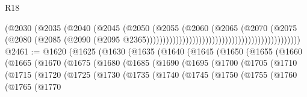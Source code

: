 \begin{lexlean}{R18}
\begin{coremodule}
                                                                      (@2030
                                                                        (@2035
                                                                          (@2040
                                                                            (@2045
                                                                              (@2050
                                                                                (@2055
                                                                                  (@2060
                                                                                    (@2065
                                                                                      (@2070
                                                                                        (@2075
                                                                                          (@2080
                                                                                            (@2085
                                                                                              (@2090
                                                                                                (@2095
                                                                                                  @2365)))))))))))))))))))))))))))))))))))))))))))))))
@2461 := @1620
    (@1625
      (@1630
        (@1635
          (@1640
            (@1645
              (@1650
                (@1655
                  (@1660
                    (@1665
                      (@1670
                        (@1675
                          (@1680
                            (@1685
                              (@1690
                                (@1695
                                  (@1700
                                    (@1705
                                      (@1710
                                        (@1715
                                          (@1720
                                            (@1725
                                              (@1730
                                                (@1735
                                                  (@1740
                                                    (@1745
                                                      (@1750
                                                        (@1755
                                                          (@1760
                                                            (@1765
                                                              (@1770

\end{coremodule}
\end{lexlean}
